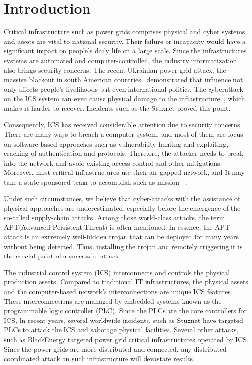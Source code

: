 \section{Introduction}
\label{sec:implant-introduction}

Critical infrastructure such as power grids comprises physical and cyber systems, and assets are vital to national security. Their failure or incapacity would have a significant impact on people's daily life on a large scale. Since the infrastructures systems are automated and computer-controlled, the industry informatization also brings security concerns. The recent Ukrainian power grid attack, the massive blackout in south American countries~\cite{haes2019survey} demonstrated that influence not only affects people's livelihoods but even international politics. The cyberattack on the ICS system can even cause physical damage to the infrastructure~\cite{zeller2011myth}, which makes it harder to recover. Incidents such as the Stuxnet proved this point. 

Consequently, ICS has received considerable attention due to security concerns. There are many ways to breach a computer system, and most of them are focus on software-based approaches such as vulnerability hunting and exploiting, cracking of authentication and protocols. Therefore, the attacker needs to break into the network and avoid existing access control and other mitigations. Moreover, most critical infrastructures use their air-gapped network, and It may take a state-sponsored team to accomplish such as mission ~\cite{langner2011stuxnet}. 

Under such circumstances, we believe that cyber-attacks with the assistance of physical approaches are underestimated, especially before the emergence of the so-called supply-chain attacks. Among those world-class attacks, the term APT(Advanced Persistent Threat) is often mentioned. In essence, the APT attack is an extremely well-hidden trojan that can be deployed for many years without being detected. Thus, installing the trojan and remotely triggering it is the crucial point of a successful attack.

The industrial control system (ICS) interconnects and controls the physical production assets. Compared to traditional IT infrastructures, the physical assets and the computer-based network's interconnections are unique ICS features. These interconnections are managed by embedded systems known as the programmable logic controller (PLC). Since the PLCs are the core controllers for ICS, In recent years, several worldwide incidents, such as Stuxnet \cite{langner2011stuxnet} have targeted PLCs to attack the ICS and sabotage physical facilities. Several other attacks, such as BlackEnergy \cite{cherepanov2016blackenergy, case2016analysis, soltan2016power, zhang2013time, williams2016power} targeted power grid critical infrastructures operated by ICS. Since the power grids are more distributed and connected, any distributed coordinated attack on such infrastructure will devastate results.

